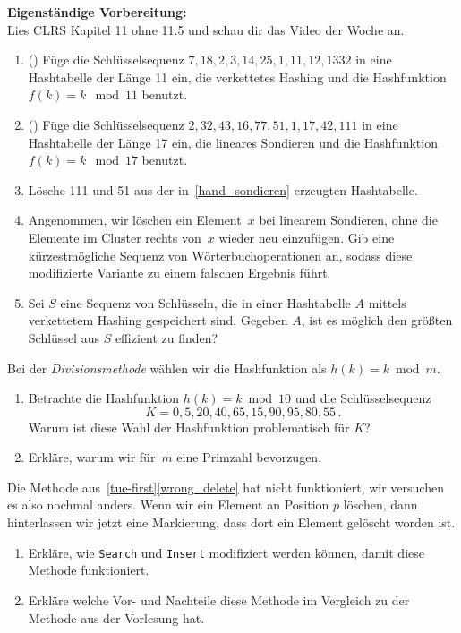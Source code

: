 \documentclass{uebung_cs}
\begin{document}
\textbf{Eigenständige Vorbereitung:}\\
Lies  CLRS Kapitel 11 ohne 11.5 und schau dir das  Video der Woche an.

\begin{aufgabe}\label{tue-first}\mbox{}
	\begin{enumerate}
		\item (\warmup) Füge die Schlüsselsequenz $7, 18, 2, 3, 14, 25, 1, 11, 12, 1332$ in eine Hashtabelle der Länge 11 ein, die verkettetes Hashing und die Hashfunktion $f(k) = k \mod 11$ benutzt.
		\item\label{hand_sondieren} (\warmup) Füge die Schlüsselsequenz $2, 32, 43, 16, 77, 51, 1, 17, 42, 111$ in eine Hashtabelle der Länge 17 ein, die lineares Sondieren und die Hashfunktion $f(k) = k \mod 17$ benutzt.
		\item Lösche 111 und 51 aus der in~\ref{hand_sondieren} erzeugten Hashtabelle.
		\item\label{wrong_delete} Angenommen, wir löschen ein Element~$x$ bei linearem Sondieren, ohne die Elemente im Cluster rechts von~$x$ wieder neu einzufügen.
		Gib eine kürzestmögliche Sequenz von Wörterbuchoperationen an, sodass diese modifizierte Variante zu einem falschen Ergebnis führt.
		\item Sei $S$ eine Sequenz von Schlüsseln, die in einer Hashtabelle $A$ mittels verkettetem Hashing gespeichert sind.
		Gegeben $A$, ist es möglich den größten Schlüssel aus $S$ effizient zu finden?
	\end{enumerate}
\end{aufgabe}

\begin{aufgabe}
	Bei der \emph{Divisionsmethode} wählen wir die Hashfunktion als $h(k)=k\bmod m$.
	\begin{enumerate}
		\item Betrachte die Hashfunktion $h(k) = k \bmod 10$ und die Schlüsselsequenz \[K = 0, 5, 20, 40, 65, 15, 90, 95, 80, 55\,.\] Warum ist diese Wahl der Hashfunktion problematisch für $K$?
		\item Erkläre, warum wir für~$m$ eine Primzahl bevorzugen.
	\end{enumerate}
\end{aufgabe}

\begin{aufgabe}
	Die Methode aus~\ref{tue-first}\ref{wrong_delete} hat nicht funktioniert, wir versuchen es also nochmal anders.
	Wenn wir ein Element an Position $p$ löschen, dann hinterlassen wir jetzt eine Markierung, dass dort ein Element gelöscht worden ist.
	\begin{enumerate}
		\item Erkläre, wie \texttt{Search} und \texttt{Insert} modifiziert werden können, damit diese Methode funktioniert.
		\item Erkläre welche Vor- und Nachteile diese Methode im Vergleich zu der Methode aus der Vorlesung hat.
	\end{enumerate}
\end{aufgabe}
\end{document}
